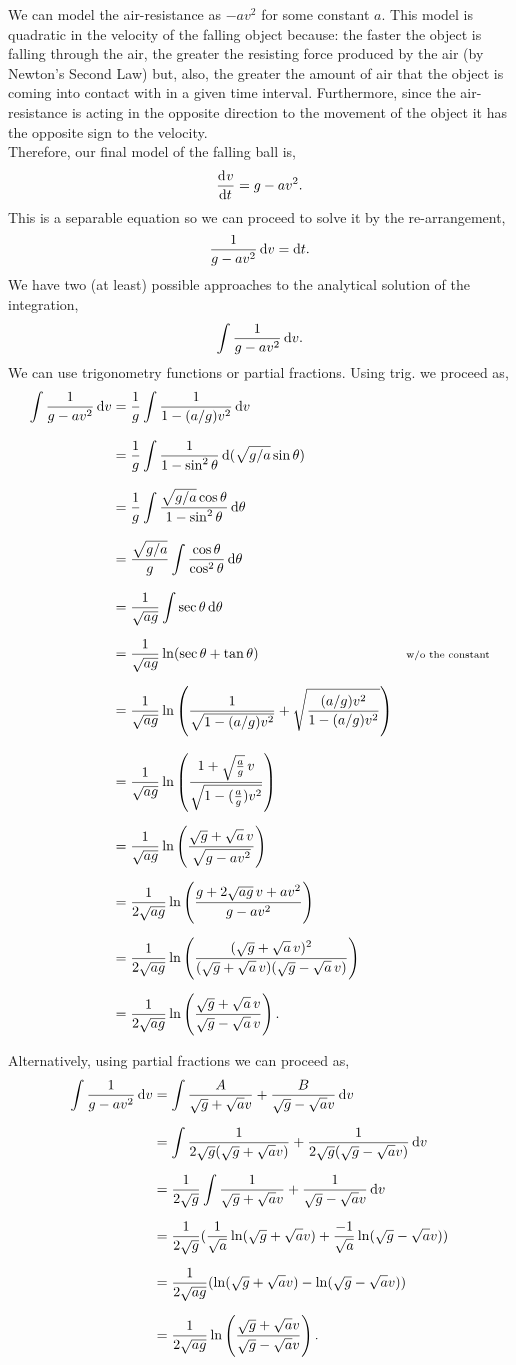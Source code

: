 \documentclass[../MathsNotesBase.tex]{subfiles}
\begin{document}
{\begin{exe}
{			We can model the air-resistance as ${ -av^2 }$ for some constant $a$. This model is quadratic in the velocity of the falling object because: the faster the object is falling through the air, the greater the resisting force produced by the air (by Newton's Second Law) but, also, the greater the amount of air that the object is coming into contact with in a given time interval. Furthermore, since the air-resistance is acting in the opposite direction to the movement of the object it has the opposite sign to the velocity.\\
			
			Therefore, our final model of the falling ball is,
			\[ \dod{v}{t} = g - av^2. \]
			This is a separable equation so we can proceed to solve it by the re-arrangement,
			\[ \frac{1}{g - av^2} \dif v = \dif t. \]
			We have two (at least) possible approaches to the analytical solution of the integration,
			\[ \int \frac{1}{g - av^2} \dif v. \]
			We can use trigonometry functions or partial fractions. Using trig. we proceed as,
			\begin{align*}
				\int \frac{1}{g - av^2} \dif v &= \frac{1}{g} \int \frac{1}{1 - (a/g)v^2} \dif v \nnn
				&= \frac{1}{g} \int \frac{1}{1 - \sin^2\theta} \dif\, (\sqrt{g/a}\sin\theta) &\sidecomment{} \nnn
				&= \frac{1}{g} \int \frac{\sqrt{g/a}\cos\theta}{1 - \sin^2\theta} \dif\theta &\sidecomment{} \nnn
				&= \frac{\sqrt{g/a}}{g} \int \frac{\cos\theta}{\cos^2\theta} \dif\theta &\sidecomment{} \nnn
				&= \frac{1}{\sqrt{ag}} \int \sec\theta \dif\theta &\sidecomment{} \nn
				&= \frac{1}{\sqrt{ag}} \ln(\sec\theta + \tan\theta) &\sidecomment{w/o the constant} \nn
				&= \frac{1}{\sqrt{ag}} \ln\left(\frac{1}{\sqrt{1 - (a/g)v^2}} + \sqrt{\frac{(a/g)v^2}{1 - (a/g)v^2}}\right) &\sidecomment{} \nnn
				&= \frac{1}{\sqrt{ag}} \ln\left(\frac{1 + \sqrt{\frac{a}{g}}\,v}{\sqrt{1 - (\frac{a}{g})v^2}}\right) \nn
				&= \frac{1}{\sqrt{ag}} \ln\left(\frac{\sqrt{g} + \sqrt{a}\,v}{\sqrt{g - av^2}}\right) \nn
				&= \frac{1}{2\sqrt{ag}} \ln\left(\frac{g + 2\sqrt{ag}\,v + av^2}{g - av^2}\right) \nn
				&= \frac{1}{2\sqrt{ag}} \ln\left(\frac{(\sqrt{g} + \sqrt{a}\,v)^2}{(\sqrt{g} + \sqrt{a}\,v)(\sqrt{g} - \sqrt{a}\,v)}\right) \nn
				&= \frac{1}{2\sqrt{ag}} \ln\left(\frac{\sqrt{g} + \sqrt{a}\,v}{\sqrt{g} - \sqrt{a}\,v}\right). \\
			\end{align*}
		
			Alternatively, using partial fractions we can proceed as,
			\begin{align*}
				\int \frac{1}{g - av^2} \dif v &= \int \frac{A}{\sqrt{g} + \sqrt{a}v} + \frac{B}{\sqrt{g} - \sqrt{a}v} \dif v \nn
				&= \int \frac{1}{2\sqrt{g}(\sqrt{g} + \sqrt{a}v)} + \frac{1}{2\sqrt{g}(\sqrt{g} - \sqrt{a}v)} \dif v \nn
				&= \frac{1}{2\sqrt{g}} \int \frac{1}{\sqrt{g} + \sqrt{a}v} + \frac{1}{\sqrt{g} - \sqrt{a}v} \dif v \nn
				&= \frac{1}{2\sqrt{g}} ( \frac{1}{\sqrt{a}} \ln(\sqrt{g} + \sqrt{a}v) + \frac{-1}{\sqrt{a}} \ln(\sqrt{g} - \sqrt{a}v) ) \nn
				&= \frac{1}{2\sqrt{ag}} ( \ln(\sqrt{g} + \sqrt{a}v) - \ln(\sqrt{g} - \sqrt{a}v) ) \nn
				&= \frac{1}{2\sqrt{ag}} \ln\left(\frac{\sqrt{g} + \sqrt{a}v}{\sqrt{g} - \sqrt{a}v}\right). \\
			\end{align*}
		
}
\end{exe}}
\end{document}
